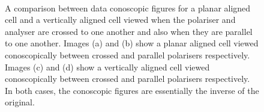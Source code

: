 \begin{figure}
\begin{center}
\\
\end{center}
\caption[Conoscopic images when polarisers are crossed and parallel]{\label{fig:pol_crossed_parallel}A comparison between data conoscopic figures for a planar aligned cell and a vertically aligned cell viewed when the polariser and analyser are crossed to one another and also when they are parallel to one another. Images (a) and (b) show a planar aligned cell viewed conoscopically between crossed and parallel polarisers respectively. Images (c) and (d) show a vertically aligned cell viewed conoscopically between crossed and parallel polarisers respectively. In both cases, the conoscopic figures are essentially the inverse of the original.}
\end{figure}

